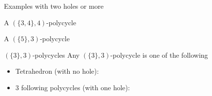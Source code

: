 \documentclass[%
pdf,
colorBG,
slideColor,
]{prosper}
\begin{document}
\begin{slide}{Examples with two holes or more}
\begin{center}
\begin{minipage}[b]{5.0cm}
\centering
{}\par
A $(\{3,4\}, 4)$-polycycle
\end{minipage}
\begin{minipage}[b]{5.0cm}
\centering
{}\par
A $(\{5\}, 3)$-polycycle
\end{minipage}
\end{center}
\end{slide}




\begin{slide}{$(\{3\},3)$-polycycles}
Any $(\{3\},3)$-polycycle is one of the following
\begin{itemize}
\item Tetrahedron (with no hole):
\begin{center}
\par
\end{center}
\item $3$ following polycycles (with one hole):
\begin{center}
\end{center}
\end{itemize}
\end{slide}
\end{document}
